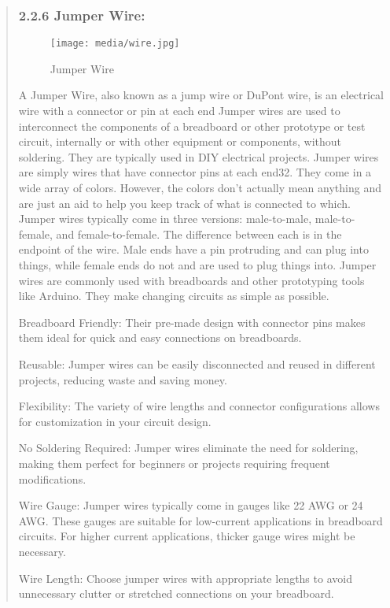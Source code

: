 \documentclass[12pt]{report}
\begin{document}
				\begin{quote}
				\subsubsection{2.2.6  Jumper Wire:}
				\begin{figure}
					\centering
				\texttt{[image: media/wire.jpg]}\\
					\caption{Jumper Wire}
				\end{figure}
				A Jumper Wire, also known as a jump wire or DuPont wire, is an electrical wire with a connector or pin at each end Jumper wires are used to interconnect the components of a breadboard or other prototype or test circuit, internally or with other equipment or components, without soldering. They are typically used in DIY electrical projects. Jumper wires are simply wires that have connector pins at each end32. They come in a wide array of colors. However, the colors don’t actually mean anything and are just an aid to help you keep track of what is connected to which. Jumper wires typically come in three versions: male-to-male, male-to-female, and female-to-female. The difference between each is in the endpoint of the wire. Male ends have a pin protruding and can plug into things, while female ends do not and are used to plug things into. Jumper wires are commonly used with breadboards and other prototyping tools like Arduino. They make changing circuits as simple as possible.
				
				Breadboard Friendly: Their pre-made design with connector pins makes them ideal for quick and easy connections on breadboards.
				
				Reusable: Jumper wires can be easily disconnected and reused in different projects, reducing waste and saving money.
				
				Flexibility: The variety of wire lengths and connector configurations allows for customization in your circuit design.
				
				No Soldering Required: Jumper wires eliminate the need for soldering, making them perfect for beginners or projects requiring frequent modifications.
				
				Wire Gauge: Jumper wires typically come in gauges like 22 AWG or 24 AWG. These gauges are suitable for low-current applications in breadboard circuits. For higher current applications, thicker gauge wires might be necessary.
				
				Wire Length: Choose jumper wires with appropriate lengths to avoid unnecessary clutter or stretched connections on your breadboard.
				

\end{quote}
\end{document}
